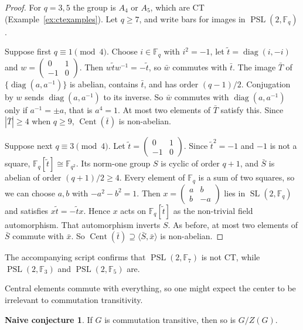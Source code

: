 \documentclass[12pt,letterpaper]{article}
\numberwithin{equation}{section}
\theoremstyle{plain}
\theoremstyle{definition}
\newtheorem{naiveconj}[theorem]{Naive conjecture}
\newcommand{\F}{\mathbb{F}}
\DeclareMathOperator{\Cent}{Cent}
\DeclareMathOperator{\SL}{SL}
\DeclareMathOperator{\PSL}{PSL}
\DeclareMathOperator{\diag}{diag}
\begin{document}
\begin{proof}
For $q=3,5$ the group is $A_4$ or $A_5$, which are CT
(Example~\ref{ex:ctexamples}). Let $q\ge7$, and write bars for images in
$\PSL(2,\F_q)$.

Suppose first $q\equiv1\pmod4$. Choose $i\in\F_q$ with $i^2=-1$, let
$\tilde t=\diag(i,-i)$ and $w=\left(\begin{smallmatrix}0&1\\-1&0
\end{smallmatrix}\right)$. Then $w\tilde tw^{-1}=-\tilde t$, so $\bar w$
commutes with $\bar t$. The image $\bar T$ of $\{\diag(a,a^{-1})\}$ is
abelian, contains $\bar t$, and has order $(q-1)/2$. Conjugation by $w$
sends $\diag(a,a^{-1})$ to its inverse. So $\bar w$ commutes with
$\diag(a,a^{-1})$ only if $a^{-1}=\pm a$, that is $a^4=1$. At most two
elements of $\bar T$ satisfy this. Since $|\bar T|\ge4$ when $q\ge9$,
$\Cent(\bar t)$ is non-abelian.

Suppose next $q\equiv3\pmod4$. Let $\tilde t=\left(\begin{smallmatrix}0&1\\
-1&0\end{smallmatrix}\right)$. Since $\tilde t^2=-1$ and $-1$ is not a
square, $\F_q[\tilde t]\cong\F_{q^2}$. Its norm-one group $S$ is cyclic of
order $q+1$, and $\bar S$ is abelian of order $(q+1)/2\ge4$. Every element
of $\F_q$ is a sum of two squares, so we can choose $a,b$ with
$-a^2-b^2=1$. Then $x=\left(\begin{smallmatrix}a&b\\b&-a\end{smallmatrix}
\right)$ lies in $\SL(2,\F_q)$ and satisfies $x\tilde t=-\tilde tx$. Hence
$x$ acts on $\F_q[\tilde t]$ as the non-trivial field automorphism. That
automorphism inverts $S$. As before, at most two elements of $\bar S$
commute with $\bar x$. So $\Cent(\bar t)\supseteq\langle\bar S,\bar x
\rangle$ is non-abelian.
\end{proof}

The accompanying script confirms that $\PSL(2,\F_7)$ is not CT, while
$\PSL(2,\F_3)$ and $\PSL(2,\F_5)$ are.

Central elements commute with everything, so one might expect the center
to be irrelevant to commutation transitivity.

\begin{naiveconj}\label{conj:quotient}
If $G$ is commutation transitive, then so is $G/Z(G)$.
\end{naiveconj}
\end{document}
